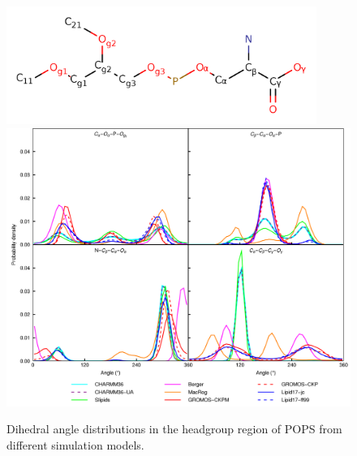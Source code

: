 \documentclass[journal=jpcbfk,manuscript=article]{achemso}
\begin{document}
\begin{figure}[]
  \centering
  \includegraphics[width=0.9\textwidth]{../Figs/PS_Labels.png}
  \includegraphics[width=1.0\textwidth]{../Figs/figS7.png}
  \caption{\label{dihedralsHG}
    Dihedral angle distributions in the headgroup region of POPS from different simulation models.
  }
\end{figure}
\end{document}
